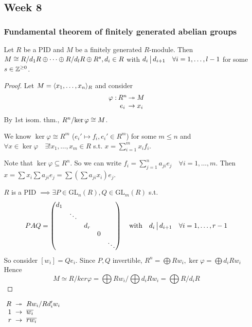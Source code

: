 \subsection{Week 8}
\subsubsection{Fundamental theorem of finitely generated abelian groups}

\begin{theorem}
  Let $R$ be a PID and $M$ be a finitely generated $R$-module.
  Then $M \cong {R}/{d_1 R} \oplus \dots \oplus {R}/{d_l R} \oplus R^s,
  d_i \in R$ with $d_i \,\big|\, d_{i+1} \quad \forall i = 1, \dots, l-1$
  for some $s \in \mathbb{Z}^{\ge 0}$.

  \begin{proof}
    Let $M = \langle x_1, \dots, x_n\rangle_R$ and consider
    \[
      \arraycolsep=1pt
      \begin{array}{rcl}
        \varphi: & R^n & \onto M \\
                 & e_i & \to x_i
      \end{array}
    \]
    By 1st isom. thm., ${R^n}/{\ker \varphi} \cong M$.

    We know $\ker \varphi \cong R^m$ ($e_i' \mapsto f_i, e_i' \in R^m$)
    for some $m \le n$ and
    $\forall x \in \ker\varphi \quad \exists! x_1, \dots, x_m \in R$ s.t.
    $x = \sum_{i=1}^m x_i f_i$.

    Note that $\ker \varphi \subseteq R^n$. So we can write
    $f_i = \sum_{j=1}^n a_{ji}e_j \quad \forall i = 1,\dots, m$.
    Then $x = \sum x_i \sum a_{ji}e_j =
    \sum \left(\sum a_{ji}x_i\right) e_j$.

    $R$ is a PID $\implies \exists P \in \text{GL}_n(R), Q \in \text{GL}_m(R)$
    s.t.
    \[
      PAQ = \begin{pmatrix}
      d_1 \\
      & \ddots \\
      & & d_r \\
      & & & 0 \\
      & & & & \ddots
      \end{pmatrix}
      \quad \text{with} \quad
      d_i \,\big|\, d_{i+1} \quad \forall i = 1, \dots, r-1
    \]
    So consider $[w_i] = Q e_i$. Since $P, Q$ invertible, $R^n = \bigoplus R w_i, \ker \varphi = \bigoplus d_i R w_i$
    Hence
    \[ M \simeq R / ker \varphi = \bigoplus R w_i / \bigoplus d_i R w_i = \bigoplus R / d_i R \]
  \end{proof}

  $\arraycolsep=3pt
  \begin{array}{rcl}
    R & \onto & \quot{Rw_i}{Rd_i'w_i} \\
    1 & \to & \ob{w_i} \\
    r & \to & \ob{rw_i}
  \end{array}
    $
\end{theorem}


